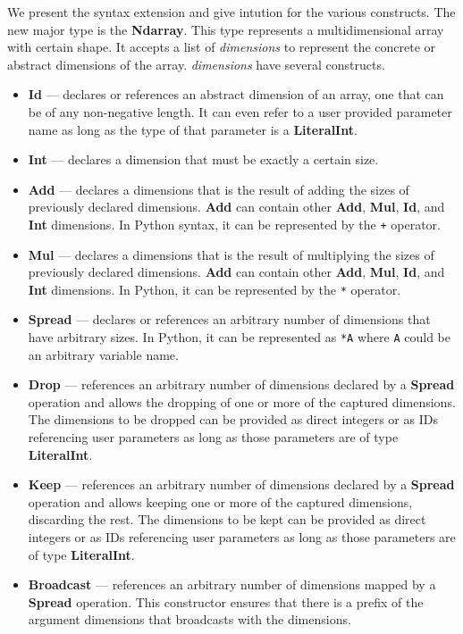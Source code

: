 \documentclass[12pt]{report}
\begin{document}
We present the syntax extension and give intution for the various constructs. The new major type is the \textbf{Ndarray}. This type represents a multidimensional array with certain shape. It accepts a list of \textit{dimensions} to represent the concrete or abstract dimensions of the array. \textit{dimensions} have several constructs.
\begin{itemize}
    \item \textbf{Id} --- declares or references an abstract dimension of an array, one that can be of any non-negative length. It can even refer to a user provided parameter name as long as the type of that parameter is a \textbf{LiteralInt}.

    \item \textbf{Int} --- declares a dimension that must be exactly a certain size.

    \item \textbf{Add} --- declares a dimensions that is the result of adding the sizes of previously declared dimensions. \textbf{Add} can contain other \textbf{Add}, \textbf{Mul}, \textbf{Id}, and \textbf{Int} dimensions. In Python syntax, it can be represented by the \texttt{+} operator.

    \item \textbf{Mul} --- declares a dimensions that is the result of multiplying the sizes of previously declared dimensions. \textbf{Add} can contain other \textbf{Add}, \textbf{Mul}, \textbf{Id}, and \textbf{Int} dimensions. In Python, it can be represented by the \texttt{*} operator.

    \item \textbf{Spread} --- declares or references an arbitrary number of dimensions that have arbitrary sizes. In Python, it can be represented as \texttt{*A} where \texttt{A} could be an arbitrary variable name.

    \item \textbf{Drop} --- references an arbitrary number of dimensions declared by a \textbf{Spread} operation and allows the dropping of one or more of the captured dimensions. The dimensions to be dropped can be provided as direct integers or as IDs referencing user parameters as long as those parameters are of type \textbf{LiteralInt}.

    \item \textbf{Keep} --- references an arbitrary number of dimensions declared by a \textbf{Spread} operation and allows keeping one or more of the captured dimensions, discarding the rest. The dimensions to be kept can be provided as direct integers or as IDs referencing user parameters as long as those parameters are of type \textbf{LiteralInt}.

    \item \textbf{Broadcast} --- references an arbitrary number of dimensions mapped by a \textbf{Spread} operation. This constructor ensures that there is a prefix of the argument dimensions that broadcasts with the dimensions.

\end{itemize}
\end{document}
